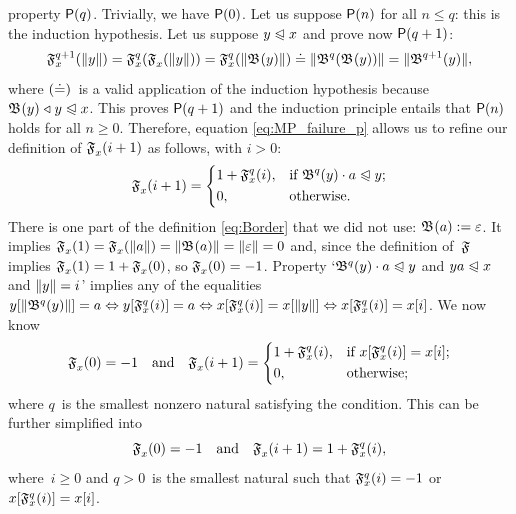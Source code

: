property \(\textsf{P}({q})\). Trivially, we have \(\textsf{P}({0})\). Let us
suppose \(\textsf{P}({n})\) for all \(n \leqslant q\): this is the
induction hypothesis. Let us suppose \(y \mathrel{\trianglelefteqslant} x\) and prove now
\(\textsf{P}({q+1})\):
\begin{equation*}
  \mathfrak{F}_{x}^{q+1}(\lVert{y}\rVert{})
= \mathfrak{F}_{x}^{q}(\mathfrak{F}_{x}^{}(\lVert{y}\rVert{}))
= \mathfrak{F}_{x}^{q}(\lVert{\mathfrak{B}^{}(y)}\rVert{})
\doteq \lVert{\mathfrak{B}^{q}(\mathfrak{B}^{}(y))}\rVert{}
= \lVert{\mathfrak{B}^{q+1}(y)}\rVert{},
\end{equation*}
where \((\smash{\doteq})\)~is a valid application of the induction
hypothesis because \(\mathfrak{B}^{}(y) \mathrel{\triangleleft} y \mathrel{\trianglelefteqslant} x\). This proves
\(\textsf{P}({q+1})\) and the induction principle entails that
\(\textsf{P}({n})\) holds for all \(n \geqslant 0\). Therefore, equation
\eqref{eq:MP_failure_p} allows us to refine our definition of
\(\mathfrak{F}_{x}^{}(i+1)\) as follows, with \(i>0\):
\begin{equation*}
\mathfrak{F}_{x}^{}(i+1) =
\left\{
  \begin{aligned}
   & 1 + \mathfrak{F}_{x}^{q}(i),
   && \text{if \(\mathfrak{B}^{q}(y) \cdot a \mathrel{\trianglelefteqslant}y\)};\\
   & 0,
   && \text{otherwise.}
  \end{aligned}
\right.
\end{equation*}
There is one part of the definition \eqref{eq:Border}
 that we did not use: \({\mathfrak{B}^{}(a) :=
  \varepsilon}\). It implies \(\mathfrak{F}_{x}^{}(1) =
\mathfrak{F}_{x}^{}(\lVert{a}\rVert{}) = \lVert{\mathfrak{B}^{}(a)}\rVert{} = \lVert{\varepsilon}\rVert{} =
0\) and, since the definition of~\(\mathfrak{F}\) implies
\(\mathfrak{F}_{x}^{}(1) = 1 + \mathfrak{F}_{x}^{}(0)\), so
\(\mathfrak{F}_{x}^{}(0) = -1\). Property `\(\mathfrak{B}^{q}(y) \cdot a \mathrel{\trianglelefteqslant}
y\) and \({ya \mathrel{\trianglelefteqslant} x}\) and \({\lVert{y}\rVert{} = i}\)' implies any of the
equalities \(\smash{{y}[{\lVert{\mathfrak{B}^{q}(y)}\rVert{}}]} = a \Leftrightarrow
\smash{{y}[{\mathfrak{F}_{x}^{q}(i)}]} = a \Leftrightarrow
\smash{{x}[{\mathfrak{F}_{x}^{q}(i)}]} = \smash{{x}[{\lVert{y}\rVert{}}]}
\Leftrightarrow \smash{{x}[{\mathfrak{F}_{x}^{q}(i)}]} = {x}[{i}]\).
We now know
\begin{equation*}
 \mathfrak{F}_{x}^{}(0)   = -1\quad\text{and}\quad
 \mathfrak{F}_{x}^{}(i+1) =
   \left\{
     \begin{aligned}
       & 1 + \mathfrak{F}_{x}^{q}(i),
       && \text{if \({x}[{\mathfrak{F}_{x}^{q}(i)}] = {x}[{i}]\)};\\
       & 0,
       && \text{otherwise;}
     \end{aligned}
   \right.
\end{equation*}
where \(q\)~is the smallest nonzero natural satisfying the
condition. This can be further simplified into
\begin{equation*}
\mathfrak{F}_{x}^{}(0) = -1
\quad \text{and} \quad
\mathfrak{F}_{x}^{}(i+1) = 1 + \mathfrak{F}_{x}^{q}(i),
\end{equation*}
where~\(i \geqslant 0\) and \(q>0\)~is the smallest natural such that
\(\mathfrak{F}_{x}^{q}(i) = -1\) or \(\smash{{x}[{\mathfrak{F}_{x}^{q}(i)}]}
= {x}[{i}]\).

